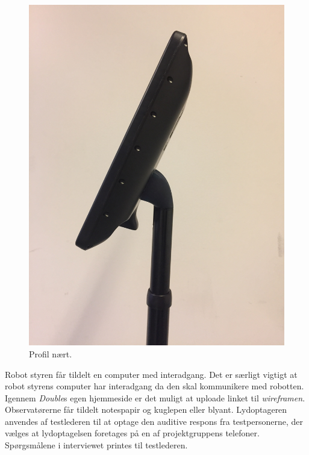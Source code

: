 \begin{figure}[H]
\begin{minipage}{.33\textwidth}
  \includegraphics[width=\linewidth, angle =-90]{Figure/ModificeretDoubleSideClose}
  \caption{Profil nært.}
  \label{fig:ModificeretDoubleSideClose}
\end{minipage}
\end{figure}
\noindent
%
Robot styren får tildelt en computer med interadgang. Det er særligt vigtigt at robot styrens computer har interadgang da den skal kommunikere med robotten. Igennem \textit{Double}s egen hjemmeside er det muligt at uploade linket til \textit{wireframen}. Observatørerne får tildelt notespapir og kuglepen eller blyant. Lydoptageren anvendes af testlederen til at optage den auditive respons fra testpersonerne, der vælges at lydoptagelsen foretages på en af projektgruppens telefoner. Spørgsmålene i interviewet printes til testlederen.
%

